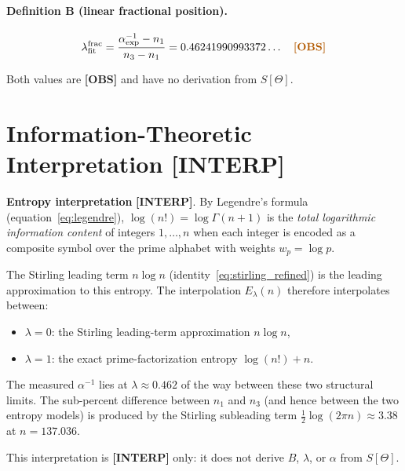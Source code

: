 \documentclass[12pt,a4paper]{article}
\theoremstyle{definition}
\theoremstyle{remark}
\newcommand{\INTERP}{\textcolor{blue!60!black}{\textbf{[INTERP]}}}
\newcommand{\OBS}{\textcolor{orange!70!black}{\textbf{[OBS]}}}
\begin{document}
\paragraph{Definition B (linear fractional position).}
\begin{equation}
  \lambda_{\mathrm{fit}}^{\mathrm{frac}} =
    \frac{\alpha_{\mathrm{exp}}^{-1} - n_1}{n_3 - n_1}
  = 0.46241990993372\ldots
  \quad \OBS
  \label{eq:lambda_frac}
\end{equation}

Both values are \OBS{} and have no derivation from $S[\Theta]$.

\section{Information-Theoretic Interpretation \INTERP}
\label{sec:interp}

\begin{infobox}
\textbf{Entropy interpretation} \INTERP{}.  By Legendre's formula
(equation~\eqref{eq:legendre}), $\log(n!) = \log\Gamma(n+1)$ is the
\emph{total logarithmic information content} of integers $1,\ldots,n$ when each
integer is encoded as a composite symbol over the prime alphabet with weights
$w_p = \log p$.

The Stirling leading term $n\log n$ (identity~\eqref{eq:stirling_refined})
is the leading approximation to this entropy.  The interpolation $E_\lambda(n)$
therefore interpolates between:
\begin{itemize}
  \item $\lambda = 0$: the Stirling leading-term approximation $n\log n$,
  \item $\lambda = 1$: the exact prime-factorization entropy $\log(n!) + n$.
\end{itemize}
The measured $\alpha^{-1}$ lies at $\lambda \approx 0.462$ of the way between
these two structural limits.  The sub-percent difference between $n_1$ and $n_3$
(and hence between the two entropy models) is produced by the Stirling subleading
term $\tfrac{1}{2}\log(2\pi n) \approx 3.38$ at $n = 137.036$.
\end{infobox}

This interpretation is \INTERP{} only: it does not derive $B$, $\lambda$, or
$\alpha$ from $S[\Theta]$.

\end{document}
